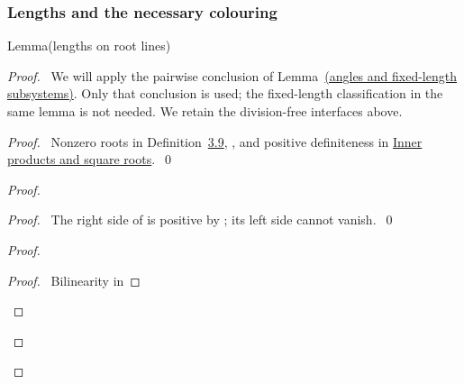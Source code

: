 \begin{mergedproofsection}
\subsubsection{Lengths and the necessary colouring}

\begin{namedresult}{Lemma}{(lengths on root lines)}\label{lem:312-lengths}
\end{namedresult}
\begin{proof}
\pfsketch\ We will apply the pairwise conclusion of
Lemma~\hyperref[lem:angles]{(angles and fixed-length subsystems)}.
Only that conclusion is used; the fixed-length classification in the same
lemma is not needed. We retain the division-free interfaces above.
\begin{proof}\pf\ Nonzero roots in Definition~\hyperref[def:3.9]{3.9}, ,
and positive definiteness in
\hyperref[facts:312-inner]{Inner products and square roots}.~\qed\end{proof}
\begin{proof}
 \begin{proof}\pf\ The right side of  is positive by
 ; its left side cannot vanish.~\qed\end{proof}
 \begin{proof}
  \begin{proof}\pf\ Bilinearity in

\end{proof}
\end{proof}
\end{proof}
\end{proof}
\end{mergedproofsection}

